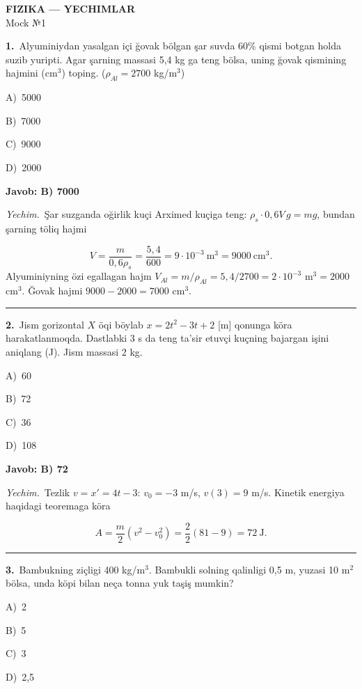 \documentclass[11pt,a4paper]{article}
\newcommand{\opt}[2]{\hspace*{4mm}#1)\ #2\par}
\begin{document}
\begin{center}{\Large\textbf{FIZIKA — YECHIMLAR}}\\[2pt]{\large Mock №1}\end{center}
\noindent\begin{minipage}{\linewidth}
\textbf{1.}\ Alyuminiydan yasalgan içi ğovak bölgan şar suvda 60\% qismi botgan holda suzib yuripti. Agar şarning massasi 5,4 kg ga teng bölsa, uning ğovak qismining hajmini (cm$^{3}$) toping. ($\rho_{Al}=2700$ kg/m$^{3}$)\par\smallskip
\opt{A}{5000}
\opt{B}{7000}
\opt{C}{9000}
\opt{D}{2000}
\end{minipage}\vspace{2pt}\par
\noindent\colorbox{gray!12}{\parbox{\dimexpr\linewidth-2\fboxsep}{\textbf{Javob: B) 7000}}}\par\smallskip
\noindent\textit{Yechim.}\ Şar suzganda oğirlik kuçi Arximed kuçiga teng: $\rho_s\cdot0{,}6V\,g=mg$, bundan şarning töliq hajmi\par
\[V=\frac{m}{0{,}6\rho_s}=\frac{5{,}4}{600}=9\cdot10^{-3}\ \text{m}^3=9000\ \text{cm}^3.\]
Alyuminiyning özi egallagan hajm $V_{Al}=m/\rho_{Al}=5{,}4/2700=2\cdot10^{-3}$ m$^3=2000$ cm$^3$. Ğovak hajmi $9000-2000=7000$ cm$^3$.\par\par\medskip\hrule\medskip
{}\noindent\begin{minipage}{\linewidth}
\textbf{2.}\ Jism gorizontal $X$ öqi böylab $x=2t^2-3t+2$ [m] qonunga köra harakatlanmoqda. Dastlabki 3 s da teng ta’sir etuvçi kuçning bajargan işini aniqlang (J). Jism massasi 2 kg.\par\smallskip
\opt{A}{60}
\opt{B}{72}
\opt{C}{36}
\opt{D}{108}
\end{minipage}\vspace{2pt}\par
\noindent\colorbox{gray!12}{\parbox{\dimexpr\linewidth-2\fboxsep}{\textbf{Javob: B) 72}}}\par\smallskip
\noindent\textit{Yechim.}\ Tezlik $v=x'=4t-3$: $v_0=-3$ m/s, $v(3)=9$ m/s. Kinetik energiya haqidagi teoremaga köra\par
\[A=\frac{m}{2}\left(v^2-v_0^2\right)=\frac{2}{2}(81-9)=72\ \text{J}.\]\par\medskip\hrule\medskip
{}\noindent\begin{minipage}{\linewidth}
\textbf{3.}\ Bambukning ziçligi 400 kg/m$^{3}$. Bambukli solning qalinligi 0,5 m, yuzasi 10 m$^{2}$ bölsa, unda köpi bilan neça tonna yuk taşiş mumkin?\par\smallskip
\opt{A}{2}
\opt{B}{5}
\opt{C}{3}
\opt{D}{2,5}
\end{minipage}\vspace{2pt}\par
\end{document}
